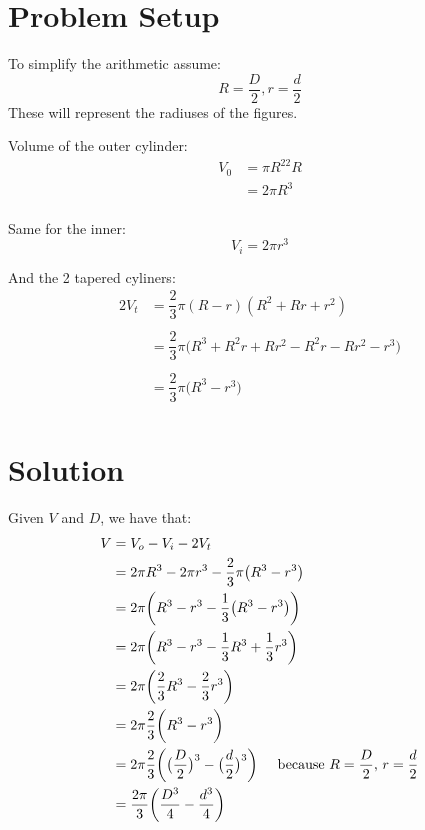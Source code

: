 \documentclass{article}
\begin{document}
  \section*{Problem Setup}
  To simplify the arithmetic assume:
  \[R=\dfrac{D}{2}, r=\dfrac{d}{2}\]
  These will represent the radiuses of the figures.

  
  Volume of the outer cylinder:
  \begin{align*}
    V_0 &= \pi{}R^22R\\
    &= 2\pi{}R^3\\
  \end{align*}

  Same for the inner:
  \[V_i = 2\pi{}r^3\]

  And the 2 tapered cyliners:
  \begin{align*}
    2V_t &= \dfrac{2}{3}\pi{}(R-r)(R^2 + Rr + r^2)\\\\
    &= \dfrac{2}{3}\pi{}\big(R^3 + R^2r + Rr^2 - R^2r - Rr^2 - r^3\big)\\\\
    &= \dfrac{2}{3}\pi{}\big(R^3 - r^3\big)\\
  \end{align*}

  \section*{Solution}
  Given $V$ and $D$, we have that:
  \begin{align*}
    V &= V_o - V_i - 2V_t\\
    &= 2\pi{}R^3 - 2\pi{}r^3 - \dfrac{2}{3}\pi{}\big(R^3 - r^3\big)\\
    &= 2\pi{}\bigg(R^3 - r^3 - \dfrac{1}{3}\big(R^3 - r^3\big)\bigg)\\
    &= 2\pi{}\bigg(R^3 - r^3 - \dfrac{1}{3}R^3 + \dfrac{1}{3}r^3\bigg)\\
    &= 2\pi\bigg(\dfrac{2}{3}R^3 - \dfrac{2}{3}r^3\bigg)\\
    &= 2\pi{}\dfrac{2}{3}\bigg(R^3 - r^3\bigg)\\
    &= 2\pi{}\dfrac{2}{3}\bigg(\big(\dfrac{D}{2}\big)^3 - \big(\dfrac{d}{2}\big)^3\bigg)\hspace{.5cm}\text{because } R=\dfrac{D}{2}\text{, }r=\dfrac{d}{2}\\
    &= \dfrac{2\pi{}}{3}\bigg(\dfrac{D^3}{4} - \dfrac{d^3}{4}\bigg)\\
  \end{align*}
\end{document}
